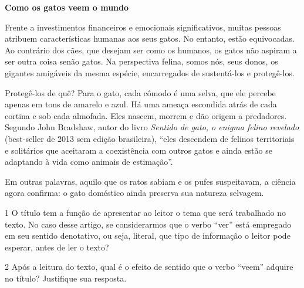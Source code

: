 \begin{myquote}
\begin{center}
\textbf{Como os gatos veem o mundo}
\end{center}

\noindent Frente a investimentos financeiros e emocionais significativos, muitas
pessoas atribuem características humanas aos seus gatos. No entanto,
estão equivocadas. Ao contrário dos cães, que desejam ser como os
humanos, os gatos não aspiram a ser outra coisa senão gatos. Na
perspectiva felina, somos nós, seus donos, os gigantes amigáveis da
mesma espécie, encarregados de sustentá-los e protegê-los.

Protegê-los de quê? Para o gato, cada cômodo é uma selva, que ele
percebe apenas em tons de amarelo e azul. Há uma ameaça escondida atrás
de cada cortina e sob cada almofada. Eles nascem, morrem e dão origem a
predadores. Segundo John Bradshaw, autor do livro \emph{Sentido de gato, o
enigma felino revelado} (best-seller de 2013 sem edição brasileira),
``eles descendem de felinos territoriais e solitários que aceitaram a
coexistência com outros gatos e ainda estão se adaptando à vida como
animais de estimação''.

Em outras palavras, aquilo que os ratos sabiam e os pufes suspeitavam, a
ciência agora confirma: o gato doméstico ainda preserva sua natureza
selvagem.

\end{myquote}

\num{1} O título tem a função de apresentar ao leitor o tema que será
trabalhado no texto. No caso desse artigo, se considerarmos que o verbo
``ver'' está empregado em seu sentido denotativo, ou seja, literal, que
tipo de informação o leitor pode esperar, antes de ler o texto?



\pagebreak

\num{2} Após a leitura do texto, qual é o efeito de sentido que o verbo
``veem'' adquire no título? Justifique sua resposta.



